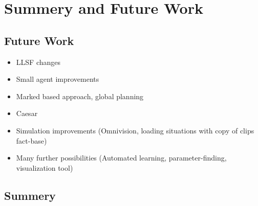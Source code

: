 \documentclass[a4paper,11pt]{article}
\begin{document}
\section{Summery and Future Work}
\subsection{Future Work}
\begin{itemize}
\item LLSF changes
\item Small agent improvements
\item Marked based approach, global planning
\item Caesar
\item Simulation improvements (Omnivision, loading situations with copy of clips fact-base)
\item Many further possibilities (Automated learning, parameter-finding, visualization tool)
\end{itemize}
\subsection{Summery}



\end{document}
